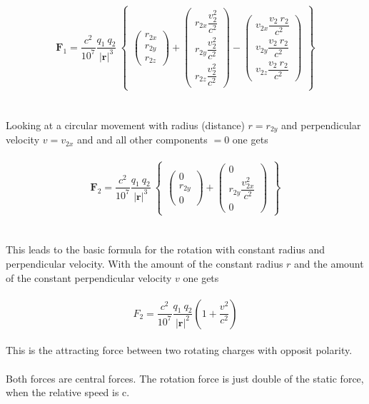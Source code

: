 \documentclass[10pt,titlepage]{article}
\begin{document}
\begin{equation}
\textbf{$\textbf{F}_1$}=\frac{c^2}{10^7}\dfrac{q_1 \ q_2}{\vert\textbf{r}\vert^3} \ 
\begin{Bmatrix}
\begin{pmatrix}r_{2x} \\ r_{2y}\\r_{2z}\end{pmatrix}+
\begin{pmatrix}r_{2x}\dfrac{v_2^2}{c^2} \\	r_{2y}\dfrac{v_2^2}{c^2} \\r_{2z}\dfrac{v_2^2}{c^2}\end{pmatrix}-
\begin{pmatrix}v_{2x}\dfrac{v_2 \ r_2}{c^2} \\	v_{2y}\dfrac{v_2 \ r_2}{c^2} \\v_{2z}\dfrac{v_2 \ r_2}{c^2}\end{pmatrix}
\end{Bmatrix}
\end{equation}
\\\\

Looking at a circular movement with radius (distance) $r=r_{2y}$ and perpendicular velocity $v=v_{2x}$ and
and all other components $=0$ one gets
\\
\\
\begin{equation}
\textbf{$\textbf{F}_2$}=\frac{c^2}{10^7}\dfrac{q_1 \ q_2}{\vert\textbf{r}\vert^3} \ 
\begin{Bmatrix}
\begin{pmatrix}0 \\ r_{2y}\\0\end{pmatrix}+
\begin{pmatrix}0 \\	r_{2y}\dfrac{v_{2x}^2}{c^2} \\0\end{pmatrix}
\end{Bmatrix}
\end{equation}
\\
\\
This leads to the basic formula for the rotation with constant radius and perpendicular velocity.
With the amount of the constant radius $r$ and the amount of the constant perpendicular velocity $v$ one gets
\\\\
\begin{equation}
F_2 =\frac{c^2}{10^7}\dfrac{q_1 \ q_2}{\vert\textbf{r}\vert^2}  (1+ \frac{v^2}{c^2})
\end{equation}
\\
This is the attracting force between two rotating charges with opposit polarity.
\\
\\
Both forces are central forces.
The rotation force is just double of the static force, when the relative speed is c.
\\
\\
\end{document}
